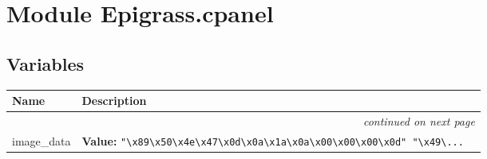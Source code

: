 %
%
%


\section{Module Epigrass.cpanel}

    \label{Epigrass:cpanel}


  \subsection{Variables}

\begin{longtable}{|p{}|p{}|l}
\cline{1-2}
\cline{1-2} \centering \textbf{Name} & \centering \textbf{Description}& \\
\cline{1-2}
\endhead\cline{1-2}\multicolumn{3}{r}{\small\textit{continued on next page}}\\\endfoot\cline{1-2}
\endlastfoot\raggedright i\-m\-a\-g\-e\-0\-\_\-d\-a\-t\-a\- & \raggedright \textbf{Value:} 
{\tt "{\textbackslash}x89{\textbackslash}x50{\textbackslash}x4e{\textbackslash}x47{\textbackslash}x0d{\textbackslash}x0a{\textbackslash}x1a{\textbackslash}x0a{\textbackslash}x00{\textbackslash}x00{\textbackslash}x00{\textbackslash}x0d" "{\textbackslash}x49{\textbackslash}\texttt{...}}&\\
\cline{1-2}
\end{longtable}



